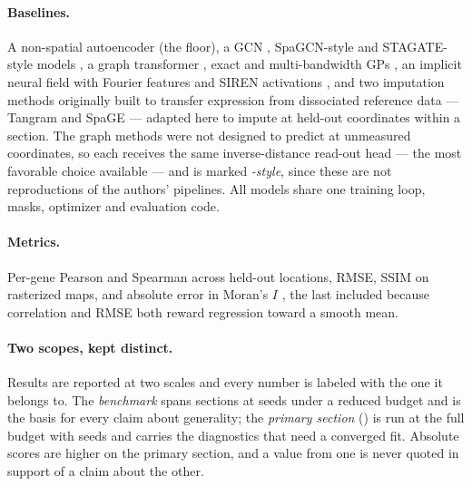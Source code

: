 \paragraph{Baselines.} A non-spatial autoencoder (the floor), a GCN
\citep{kipf2017gcn}, SpaGCN-style and STAGATE-style models
\citep{hu2021spagcn,dong2022stagate}, a graph transformer
\citep{vaswani2017attention}, exact and multi-bandwidth GPs
\citep{rasmussen2006gp}, an implicit neural field with Fourier features and
SIREN activations \citep{tancik2020fourier}, and two imputation methods
originally built to transfer expression from dissociated reference data ---
Tangram \citep{biancalani2021tangram} and SpaGE \citep{abdelaal2020spage} ---
adapted here to impute at held-out coordinates within a section. The graph methods were not designed
to predict at unmeasured coordinates, so each receives the same inverse-distance
read-out head --- the most favorable choice available --- and is marked
\emph{-style}, since these are not reproductions of the authors' pipelines. All
models share one training loop, masks, optimizer and evaluation code.

\paragraph{Metrics.} Per-gene Pearson and Spearman across held-out locations,
RMSE, SSIM \citep{wang2004ssim} on rasterized maps, and absolute error in Moran's
$I$ \citep{moran1950}, the last included because correlation and RMSE both reward
regression toward a smooth mean.

\paragraph{Two scopes, kept distinct.} Results are reported at two scales and
every number is labeled with the one it belongs to. The \emph{benchmark} spans
\MSSections{} sections at \MSSeeds{} seeds under a reduced budget and is the
basis for every claim about generality; the \emph{primary section}
(\DiffLenSection{}) is run at the full budget with \NSeeds{} seeds and carries
the diagnostics that need a converged fit. Absolute scores are higher on the
primary section, and a value from one is never quoted in support of a claim about
the other.

